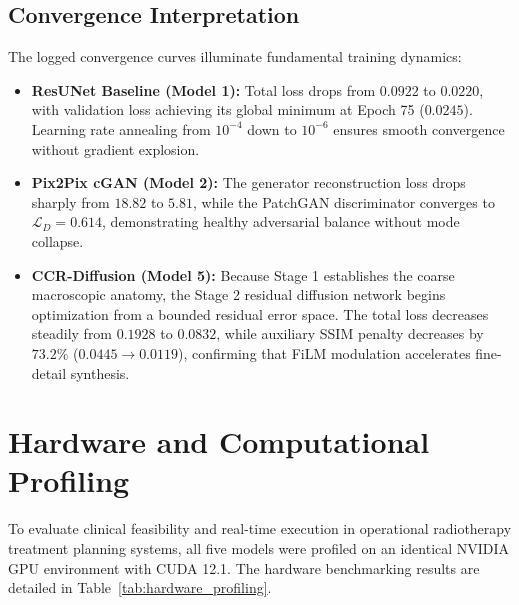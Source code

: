 \subsection{Convergence Interpretation}
The logged convergence curves illuminate fundamental training dynamics:
\begin{itemize}
    \item \textbf{ResUNet Baseline (Model 1):} Total loss drops from $0.0922$ to $0.0220$, with validation loss achieving its global minimum at Epoch 75 ($0.0245$). Learning rate annealing from $10^{-4}$ down to $10^{-6}$ ensures smooth convergence without gradient explosion.
    \item \textbf{Pix2Pix cGAN (Model 2):} The generator reconstruction loss drops sharply from $18.82$ to $5.81$, while the PatchGAN discriminator converges to $\mathcal{L}_D = 0.614$, demonstrating healthy adversarial balance without mode collapse.
    \item \textbf{CCR-Diffusion (Model 5):} Because Stage 1 establishes the coarse macroscopic anatomy, the Stage 2 residual diffusion network begins optimization from a bounded residual error space. The total loss decreases steadily from $0.1928$ to $0.0832$, while auxiliary SSIM penalty decreases by $73.2\%$ ($0.0445 \to 0.0119$), confirming that FiLM modulation accelerates fine-detail synthesis.
\end{itemize}

\section{Hardware and Computational Profiling}
To evaluate clinical feasibility and real-time execution in operational radiotherapy treatment planning systems, all five models were profiled on an identical NVIDIA GPU environment with CUDA 12.1. The hardware benchmarking results are detailed in Table~\ref{tab:hardware_profiling}.

